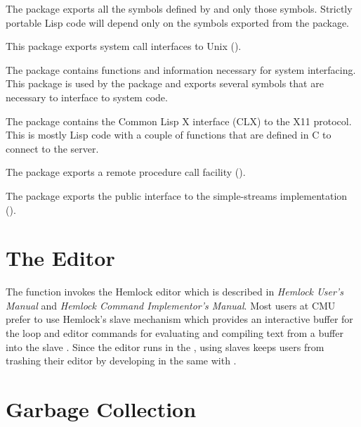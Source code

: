 \begin{Lentry}
\item[\code{common-lisp (cl)}] The  package
  exports all the symbols defined by \cltl{} and only those symbols.
  Strictly portable Lisp code will depend only on the symbols exported
  from the  package.
  
\item[\code{unix}] This package exports system call
  interfaces to Unix ().
  
\item[\code{system (sys)}] The  package contains
  functions and information necessary for system interfacing.  This
  package is used by the  package and exports several
  symbols that are necessary to interface to system code.
  
\item[\code{xlib}] The  package contains the Common Lisp X
  interface (CLX) to the X11 protocol.  This is mostly Lisp code with
  a couple of functions that are defined in C to connect to the
  server.
  
\item[\code{wire}] The  package exports a remote procedure
  call facility ().

\item[\code{stream}] The  package exports the public
  interface to the simple-streams implementation ().
\end{Lentry}








\section{The Editor}

The  function invokes the Hemlock editor which is described
in {\it Hemlock User's Manual} and {\it Hemlock Command Implementor's
Manual}. Most users at CMU prefer to use Hemlock's slave \llisp{}
mechanism which provides an interactive buffer for the
 loop and editor commands for evaluating and
compiling text from a buffer into the slave \llisp.  Since the editor
runs in the \llisp, using slaves keeps users from trashing their
editor by developing in the same \llisp{} with \hemlock{}.


\section{Garbage Collection}

